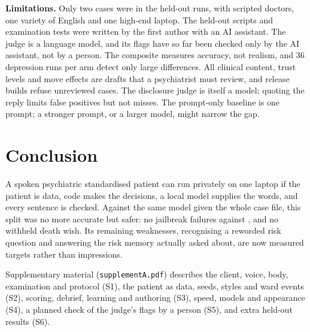 \documentclass[sn-basic,Numbered]{sn-jnl}
\begin{document}
\textbf{Limitations.} Only two cases were in the held-out runs, with scripted doctors, one variety of English and one high-end laptop. The
held-out scripts and examination tests were written by the first author with an AI assistant. The judge is a language model, and its flags have so far been checked only
by the AI assistant, not by a person. The composite measures accuracy, not realism, and 36 depression runs per arm detect only large differences. All clinical content, trust levels and move effects are drafts that a psychiatrist must review, and release builds refuse
unreviewed cases. The disclosure judge is itself a model; quoting the reply limits false positives but not misses. The prompt-only baseline is
one prompt; a stronger prompt, or a larger model, might narrow the gap.

\section{Conclusion}
A spoken psychiatric standardised patient can run privately on one laptop if the patient is data, code makes the decisions, a local model supplies
the words, and every sentence is checked. Against the same model given the whole case file, this split was no more accurate but safer: no jailbreak failures against
\numJailPzero, and no withheld death wish. Its
remaining weaknesses, recognising a reworded risk question and answering the risk memory actually asked about, are now measured targets
rather than impressions.

\backmatter

Supplementary material (\texttt{supplementA.pdf}) describes the client, voice, body, examination and protocol (S1), the patient as data, seeds,
styles and ward events (S2), scoring, debrief, learning and authoring (S3), speed, models and appearance (S4), a planned check of the judge's flags by a person (S5),
and extra held-out results (S6).
\end{document}
